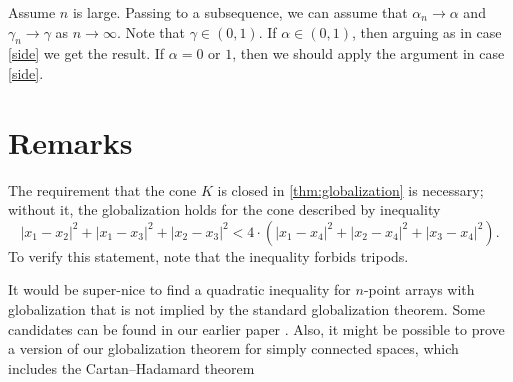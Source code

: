 \documentclass[a4paper,10pt]{article}
\begin{document}
Assume $n$ is large.
Passing to a subsequence, we can assume that $\alpha_n\to \alpha$ and $\gamma_n\to \gamma$ as $n\to \infty$.
Note that $\gamma\in (0,1)$.
If $\alpha\in (0,1)$, then arguing as in case \ref{side} we get the result.
If $\alpha=0$ or $1$, then we should apply the argument in case \ref{side}.
\qeds

\section{Remarks}

The requirement that the cone $K$ is closed in \ref{thm:globalization} is necessary;
without it, the globalization holds for the cone described by inequality
\[|x_1-x_2|^2+|x_1-x_3|^2+|x_2-x_3|^2<4\cdot(|x_1-x_4|^2+|x_2-x_4|^2+|x_3-x_4|^2).\]
To verify this statement, note that the inequality forbids tripods.

It would be super-nice to find a quadratic inequality for $n$-point arrays with globalization that is not implied by the standard globalization theorem.
Some candidates can be found in our earlier paper \cite{lebedeva-petrunin-zolotov}.
Also, it might be possible to prove a version of our globalization theorem
for simply connected spaces, which includes the Cartan--Hadamard theorem

{\sloppy
\def\emph{\textit}
\printbibliography[heading=bibintoc]
\fussy
}
\end{document}
